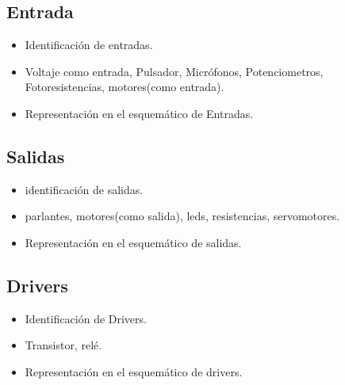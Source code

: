 \documentclass{article}
\begin{document}
\subsection{Entrada}
\begin{itemize}
\item Identificación de entradas.
\item Voltaje como entrada, Pulsador, Micrófonos, Potenciometros, Fotoresistencias, motores(como entrada).
\item Representación en el esquemático de Entradas.
\end{itemize}
\subsection{Salidas}
\begin{itemize}
\item identificación de salidas.
\item parlantes, motores(como salida), leds, resistencias, servomotores.
\item Representación en el esquemático de salidas.
\end{itemize}
\subsection{Drivers}
\begin{itemize}
\item Identificación de Drivers.
\item Transistor, relé.
\item Representación en el esquemático de drivers.
\end{itemize}
\end{document}
